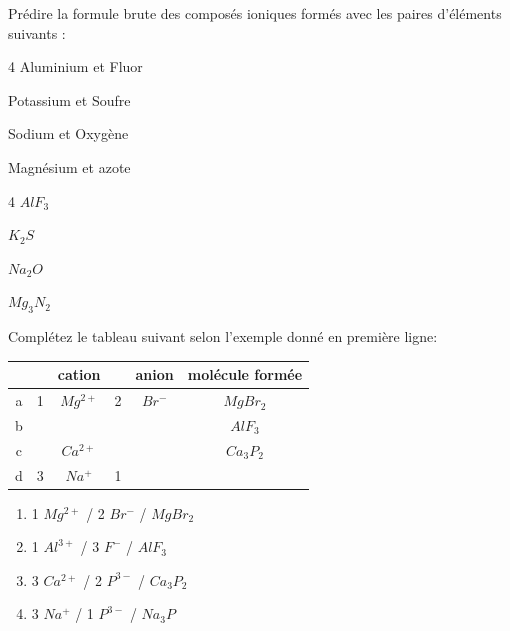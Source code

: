 \documentclass[
  11pt,
  a4paper,
  openany]{book}
\begin{document}
\newpage

\begin{Exercise}

Prédire la formule brute des composés ioniques formés avec les paires d'éléments suivants :

\begin{multicols}{4}
Aluminium et Fluor

Potassium et Soufre

Sodium et Oxygène

Magnésium et azote

\end{multicols}

\vspace{6em}

\end{Exercise}

\begin{Answer}

\begin{multicols}{4}
\(AlF_3\)

\(K_2S\)

\(Na_2O\)

\(Mg_3N_2\)

\end{multicols}

\newpage

\end{Answer}

\begin{Exercise}
Complétez le tableau suivant selon l'exemple donné en première ligne:

\end{Exercise}

\begin{longtable}[]{@{}cccccc@{}}
\toprule\noalign{}
& & cation & & anion & molécule formée \\
\midrule\noalign{}
\endhead
\bottomrule\noalign{}
\endlastfoot
a & 1 & \(Mg^{2+}\) & 2 & \(Br^-\) & \(MgBr_2\) \\
b & & & & & \(AlF_3\) \\
c & & \(Ca^{2+}\) & & & \(Ca_3P_2\) \\
d & 3 & \(Na^+\) & 1 & & \\
\end{longtable}

\begin{Answer}

\begin{enumerate}
\def\labelenumi{\alph{enumi}.}
\item
  1 \(Mg^{2+}\) / 2 \(Br^{-}\) / \(MgBr_2\)
\item
  1 \(Al^{3+}\) / 3 \(F^-\) / \(AlF_3\)
\item
  3 \(Ca^{2+}\) / 2 \(P^{3-}\) / \(Ca_3P_2\)
\item
  3 \(Na^+\) / 1 \(P^{3-}\) / \(Na_3P\)
\end{enumerate}

\end{Answer}
\end{document}
